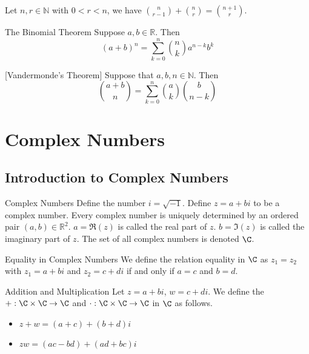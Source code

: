 \begin{prp}{}{} Let $n,r\in\mathbb{N}$ with $0<r<n$, we have $\binom{n}{r-1}+\binom{n}{r}=\binom{n+1}{r}$. 
\end{prp}

\begin{thm}{The Binomial Theorem}{} Suppose $a,b\in\mathbb{R}$. Then $$(a+b)^n=\sum_{k=0}^n\binom{n}{k}a^{n-k}b^k$$
\end{thm}

\begin{thm}{}{}[Vandermonde's Theorem] Suppose that $a,b,n\in\mathbb{N}$. Then $$\binom{a+b}{n}=\sum_{k=0}^{n}\binom{a}{k}\binom{b}{n-k}$$
\end{thm}

\pagebreak
\section{Complex Numbers}
\subsection{Introduction to Complex Numbers}
\begin{defn}{Complex Numbers}{} Define the number $i=\sqrt{-1}$. Define $z=a+bi$ to be a complex number. Every complex number is uniquely determined by an ordered pair $(a,b)\in\mathbb{R}^2$. $a=\Re(z)$ is called the real part of $z$. $b=\Im(z)$ is called the imaginary part of $z$. The set of all complex numbers is denoted $\C$. 
\end{defn}

\begin{defn}{Equality in Complex Numbers}{} We define the relation equality in $\C$ as $z_1=z_2$ with $z_1=a+bi$ and $z_2=c+di$ if and only if $a=c$ and $b=d$. 
\end{defn}

\begin{defn}{Addition and Multiplication}{} Let $z=a+bi$, $w=c+di$. We define the $+:\C\times\C\to\C$ and $\cdot:\C\times\C\to\C$ in $\C$ as follows. 
\begin{itemize}
\item $z+w=(a+c)+(b+d)i$
\item $zw=(ac-bd)+(ad+bc)i$
\end{itemize}
\end{defn}

